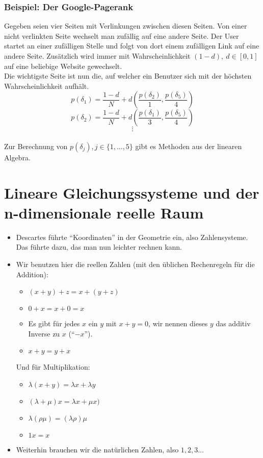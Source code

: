\documentclass{report}
\newcommand{\lb}{\lambda}
\theoremstyle{customrem}
\theoremstyle{customdef}
\theoremstyle{customenv}
\begin{document}
	\subsection*{Beispiel: Der Google-Pagerank}
	Gegeben seien vier Seiten mit Verlinkungen zwischen diesen Seiten. Von einer nicht verlinkten Seite wechselt man zufällig auf eine andere Seite. Der User startet an einer zufälligen Stelle und folgt von dort einem zufälligen Link auf eine andere Seite. Zusätzlich wird immer mit Wahrscheinlichkeit \((1-d), \ d \in [0, 1]\) auf eine beliebige Website gewechselt.\\
	Die wichtigste Seite ist nun die, auf welcher ein Benutzer sich mit der höchsten Wahrscheinlichkeit aufhält.\\
	\[
	p(\delta_1) = \frac{1-d}{N} + d\left(\frac{p(\delta_2)}{1}, \frac{p(\delta_5)}{4}\right)\]\[
	p(\delta_2) = \frac{1-d}{N} + d\left(\frac{p(\delta_1)}{3}, \frac{p(\delta_5)}{4}\right)\]\[
	\vdots
	\]\\
	Zur Berechnung von \(p(\delta_j), j \in \{1, \ldots, 5\}\) gibt es Methoden aus der linearen Algebra.
	\newpage
	\tableofcontents
	\newpage
	\chapter[Lineare Gleichungssysteme und der n-dimensionale reelle Raum]{Lineare Gleichungssysteme und der \\ n-dimensionale reelle Raum}

	\begin{itemize}
		\item Descartes führte "`Koordinaten"' in der Geometrie ein, also Zahlensysteme. Das führte dazu, das man nun leichter rechnen kann.
		\item Wir benutzen hier die reellen Zahlen (mit den üblichen Rechenregeln für die Addition):
		\begin{itemize}
			\item \((x + y) + z = x + (y + z)\)
			\item \(0 + x = x + 0 = x\)
			\item Es gibt für jedes \(x\) ein \(y\) mit \(x + y = 0\), wir nennen dieses \(y\) das additiv Inverse zu \(x\) ("`\(-x\)"').
			\item \(x + y = y + x\)
		\end{itemize}
		Und für Multiplikation:
		\begin{itemize}
			\item \(\lambda (x + y) = \lambda x + \lambda y\)
			\item \((\lambda + \mu) x = \lambda x + \mu x)\)
			\item \(\lb(\rho\mu)=(\lb\rho)\mu\)
			\item \(1x = x\)
		\end{itemize}
		\item Weiterhin brauchen wir die natürlichen Zahlen, also \(1,2,3\dots\)
	\end{itemize}
\end{document}
